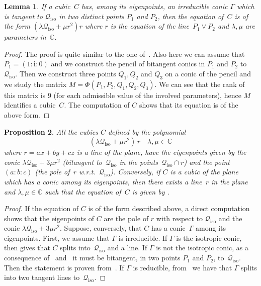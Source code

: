 \documentclass{amsart}
\theoremstyle{plain}
\newtheorem{lemma}{Lemma}[section]
\newtheorem{prop}[lemma]{Proposition}
\theoremstyle{definition}
\newcommand{\C}{\mathbb{C}}
\newcommand{\iso}{\mathcal{Q}_{\mathrm{iso}}}
\newcommand{\iii}{\textbf{i}}
\begin{document}
\begin{lemma}
\label{lemma:bitangentToCiso}
If a cubic~$C$ has, among its eigenpoints, an irreducible conic $\Gamma$
which is tangent to $\iso$ in two distinct points $P_1$ and $P_2$, then
the equation of~$C$ is of the form $(\lambda \iso + \mu r^2)r$ where
$r$ is the equation of the line~$P_1\vee P_2$ and $\lambda, \mu$ are parameters
in~$\C$.
\end{lemma}
\begin{proof}
The proof is quite similar to the one of~. Also
here we can assume that $P_1 = (1: \iii: 0)$ and we construct the pencil of
bitangent conics in $P_1$ and $P_2$ to $\iso$. Then we construct three
points $Q_1, Q_2$ and $Q_3$ on a conic of the pencil
and we study the matrix $M = \Phi(P_1, P_2, Q_1, Q_2, Q_3)$. We can see
that the rank of this matrix is $9$ (for each admissible value of the
involved parameters), hence $M$ identifies a cubic~$C$. The computation
of $C$ shows that its equation is of the above form.
\end{proof}

\begin{prop}
All the cubics $C$ defined by the polynomial
%
\begin{equation}
\label{cub_conica_eig}
  (\lambda \iso + \mu r^2) \, r \quad \mbox{$\lambda, \mu \in \C$}
\end{equation}
%
where $r=ax+by+cz$ is a line of the plane,
have the eigenpoints given by the conic
$\lambda \iso+3\mu r^2$ (bitangent to~$\iso$ in the points~$\iso \cap r$)
and the point~$(a:b:c)$ (the pole of~$r$
w.r.t.~$\iso$). Conversely, if
$C$ is a cubic of the plane which has a conic among its eigenpoints,
then there exists a line~$r$ in the plane and $\lambda, \mu \in \C$
such that the equation of~$C$ is given by .
\end{prop}
\begin{proof}
If the equation of $C$ is of the form described above, a direct computation
shows that the eigenpoints of $C$ are the pole of $r$ with respect to $\iso$
and the conic $\lambda \iso+3\mu r^2$. Suppose, conversely, that $C$ has
a conic~$\Gamma$ among its eigenpoints. 
First, we assume that $\Gamma$ is irreducible.
If $\Gamma$ is the isotropic conic,
then  gives that $C$ splits into~$\iso$ and a line.
If $\Gamma$ is not the isotropic conic, as a consequence
of~ and~ it must be bitangent,
in two points $P_1$ and $P_2$, to~$\iso$. 
Then the statement is proven from~. 
If $\Gamma$ is reducible,
from~ we have that $\Gamma$ splits
into two tangent lines to~$\iso$.
\end{proof}
\end{document}
